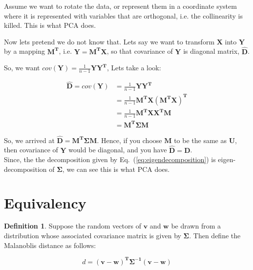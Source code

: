 \documentclass[12pt]{article}
\theoremstyle{plain}
\theoremstyle{definition}
\newtheorem{definition}{Definition}[section]
\theoremstyle{definition}
\begin{document}
Assume we want to rotate the data, or represent them in a 
coordinate system where it is represented with variables that are
orthogonal, i.e. the collinearity is killed. This is what PCA does.

Now lets pretend we do not know that. Lets say we want to
transform $\mathbf{X}$ into $\mathbf{Y}$ by a mapping $\mathbf{M^\text{T}}$, i.e. $\mathbf{Y= M^\text{T}X}$,
so that covariance of $\mathbf{Y}$ is diagonal matrix, $\mathbf{\hat{D}}$. \\
\pagebreak

So, we want $cov(\mathbf{Y}) = \frac{1}{n-1}\mathbf{Y}\mathbf{Y^\text{T}}$,
Lets take a look:

\begin{equation}\label{eq:diagonalize}
\begin{aligned}
\mathbf{\hat{D}} = cov({\mathbf{Y}}) &= \frac{1}{n-1}\mathbf{Y}\mathbf{Y^\text{T}}\\
                           &= \frac{1}{n-1}\mathbf{M^\text{T}X}\mathbf{(M^\text{T}X)^\text{T}}\\
                           &= \frac{1}{n-1} \mathbf{M^\text{T}}\mathbf{XX^\text{T}}\mathbf{ M}\\
                           &=  \mathbf{M^\text{T}}\mathbf{\Sigma}\mathbf{M}
\end{aligned}
\end{equation}

So, we arrived at $\mathbf{\hat{D}} = \mathbf{M^\text{T}}\mathbf{\Sigma}\mathbf{M}$.
Hence, if you choose $\mathbf{M}$ to be the same as $\mathbf{U}$, then
covariance of $\mathbf{Y}$ would be diagonal, and you have $\mathbf{\hat{D}}  = \mathbf{D}$.\\

Since, the the decomposition given by Eq.~(\ref{eq:eigendecomposition})
is eigen-decomposition of $\mathbf{\Sigma}$, we can see this is what PCA does.

\section{Equivalency}

\theoremstyle{definition} 
\begin{definition}
Suppose the random vectors of $\mathbf{v}$ and $\mathbf{w}$ be drawn from a distribution 
whose associated covariance matrix is given by $\mathbf{\Sigma}$. Then define the Malanoblis
distance as follows:

 \begin{equation}\label{eq:mahabDist}
 d = \mathbf{(v - w)^\text{T} \Sigma^{-1} (v - w)} 
 \end{equation}
\end{definition}
\end{document}
